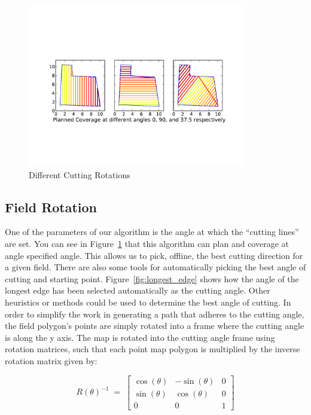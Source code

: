 \documentclass[journal]{IEEEtran}
\begin{document}
  \begin{figure}[here]
    \centering
    \includegraphics[width=3.75in,keepaspectratio]{rotations.pdf}
    \caption{Different Cutting Rotations}
    \label{fig:rotations}
  \end{figure}
  
  \subsection{Field Rotation}
  One of the parameters of our algorithm is the angle at which the ``cutting lines'' are set.  You can see in Figure~\ref{fig:rotations} that this algorithm can plan and coverage at angle specified angle.  This allows us to pick, offline, the best cutting direction for a given field.  There are also some tools for automatically picking the best angle of cutting and starting point.  Figure~\ref{fig:longest_edge} shows how the angle of the longest edge has been selected automatically as the cutting angle.  Other heuristics or methods could be used to determine the best angle of cutting.  In order to simplify the work in generating a path that adheres to the cutting angle, the field polygon's points are simply rotated into a frame where the cutting angle is along the y axis.  The map is rotated into the cutting angle frame using rotation matrices\cite[p.60]{siegwart2004introduction}, such that each point map polygon is multiplied by the inverse rotation matrix given by:
  
  $$R\left( \theta  \right)^{-1}\; =\; \left[ \begin{array}{ccc} \cos \left( \theta  \right) & -\sin \left( \theta  \right) & 0 \\ \sin \left( \theta  \right) & \cos \left( \theta  \right) & 0 \\ 0 & 0 & 1 \end{array} \right]$$
  
\end{document}
